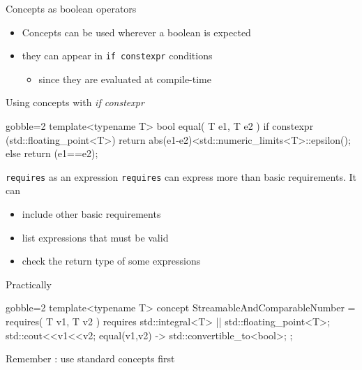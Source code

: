 \begin{frame}[fragile]
    \begin{block}{Concepts as boolean operators}
      \begin{itemize}
        \item Concepts can be used wherever a boolean is expected
        \item they can appear in \texttt{if constexpr} conditions
          \begin{itemize}
          \item since they are evaluated at compile-time
          \end{itemize}
      \end{itemize}
    \end{block}
    \begin{exampleblock}{Using concepts with {\it if constexpr}}
      \small
      \begin{cppcode*}{gobble=2}
      template<typename T>
      bool equal( T e1, T e2 )
      {
        if constexpr (std::floating_point<T>) {
          return abs(e1-e2)<std::numeric_limits<T>::epsilon();
        } else {
          return (e1==e2);
        }
      }
      \end{cppcode*}
    \end{exampleblock}
\end{frame}

\begin{frame}[fragile]
    \begin{block}{\texttt{requires} as an expression}
        \texttt{requires} can express more than basic requirements. It can
        \begin{itemize}
            \item include other basic requirements
            \item list expressions that must be valid
            \item check the return type of some expressions
        \end{itemize}
    \end{block}
    \begin{exampleblock}{Practically}
      \small
      \begin{cppcode*}{gobble=2}
      template<typename T>
      concept StreamableAndComparableNumber =
      requires( T v1, T v2 ) {
        requires std::integral<T> || std::floating_point<T>;
        std::cout<<v1<<v2;
        { equal(v1,v2) } -> std::convertible_to<bool>;
      };
      \end{cppcode*}
    \end{exampleblock}
    Remember : use standard concepts first
\end{frame}

